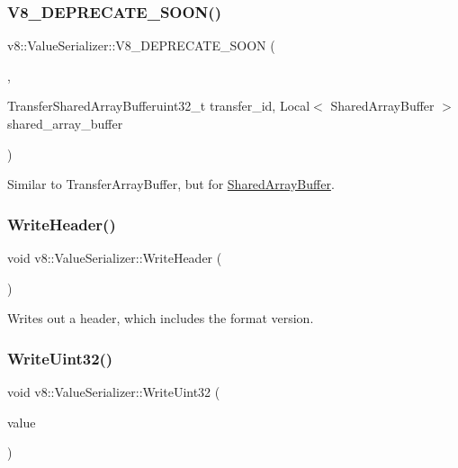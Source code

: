 \subsubsection{\texorpdfstring{V8\+\_\+\+D\+E\+P\+R\+E\+C\+A\+T\+E\+\_\+\+S\+O\+O\+N()}{V8\_DEPRECATE\_SOON()}\hspace{0.1cm}{\footnotesize\ttfamily [2/2]}}
{\footnotesize\ttfamily v8\+::\+Value\+Serializer\+::\+V8\+\_\+\+D\+E\+P\+R\+E\+C\+A\+T\+E\+\_\+\+S\+O\+ON (\begin{DoxyParamCaption}\item[{\char`\"{}Use \mbox{\hyperlink{classv8_1_1ValueSerializer_1_1Delegate_a963946ef185d992552e8d9e0e4016137}{Delegate\+::\+Get\+Shared\+Array\+Buffer\+Id}}\char`\"{}}]{,  }\item[{void }]{Transfer\+Shared\+Array\+Bufferuint32\+\_\+t transfer\+\_\+id, Local$<$ Shared\+Array\+Buffer $>$ shared\+\_\+array\+\_\+buffer }\end{DoxyParamCaption})}

Similar to Transfer\+Array\+Buffer, but for \mbox{\hyperlink{classv8_1_1SharedArrayBuffer}{Shared\+Array\+Buffer}}. \mbox{\label{classv8_1_1ValueSerializer_ac0bdf1a7731ee4e93823dabdfa8c8661}} 
\subsubsection{\texorpdfstring{Write\+Header()}{WriteHeader()}}
{\footnotesize\ttfamily void v8\+::\+Value\+Serializer\+::\+Write\+Header (\begin{DoxyParamCaption}{ }\end{DoxyParamCaption})}

Writes out a header, which includes the format version. \mbox{\label{classv8_1_1ValueSerializer_a8345af97eb58727384cab6a2738924d1}} 
\subsubsection{\texorpdfstring{Write\+Uint32()}{WriteUint32()}}
{\footnotesize\ttfamily void v8\+::\+Value\+Serializer\+::\+Write\+Uint32 (\begin{DoxyParamCaption}\item[{uint32\+\_\+t}]{value }\end{DoxyParamCaption})}

